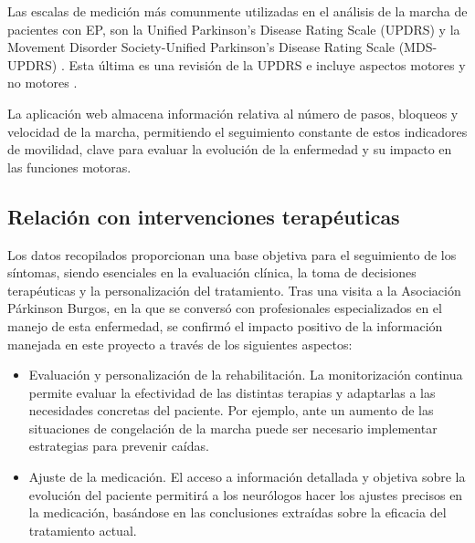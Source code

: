 Las escalas de medición más comunmente utilizadas en el análisis de la marcha de pacientes con EP, son la Unified Parkinson's Disease Rating Scale (UPDRS) y la Movement Disorder Society-Unified Parkinson's Disease Rating Scale (MDS-UPDRS) \cite{diBiase2020}. Esta última es una revisión de la UPDRS e incluye aspectos motores y no motores \cite{Escalaun14:online}.

La aplicación web almacena información relativa al número de pasos, bloqueos y velocidad de la marcha, permitiendo el seguimiento constante de estos indicadores de movilidad, clave para evaluar la evolución de la enfermedad y su impacto en las funciones motoras.


\subsection{Relación con intervenciones terapéuticas}

Los datos recopilados proporcionan una base objetiva para el seguimiento de los síntomas, siendo esenciales en la evaluación clínica, la toma de decisiones terapéuticas y la personalización del tratamiento. Tras una visita a la Asociación Párkinson Burgos, en la que se conversó con profesionales especializados en el manejo de esta enfermedad, se confirmó el impacto positivo de la información manejada en este proyecto a través de los siguientes aspectos:
\begin{itemize}
    \item Evaluación y personalización de la rehabilitación. La monitorización continua permite evaluar la efectividad de las distintas terapias y adaptarlas a las necesidades concretas del paciente. Por ejemplo, ante un aumento de las situaciones de congelación de la marcha puede ser necesario implementar estrategias para prevenir caídas.
    
    \item Ajuste de la medicación. El acceso a información detallada y objetiva sobre la evolución del paciente permitirá a los neurólogos hacer los ajustes precisos en la medicación, basándose en las conclusiones extraídas sobre la eficacia del tratamiento actual.
\end{itemize}


